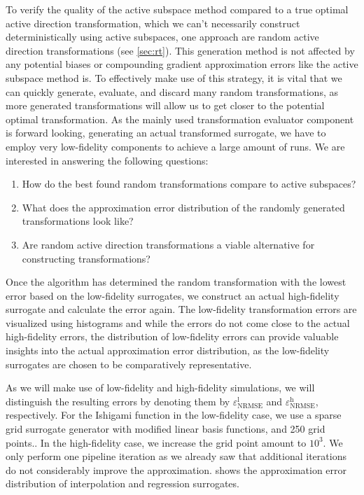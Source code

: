 \documentclass[
  a4paper,  %
  twoside,  %
  bibliography=totoc,
  headsepline,
  cleardoublepage=empty,
  parskip=half,
  draft=false
]{scrbook}
\begin{document}
To verify the quality of the active subspace method compared to a true optimal active direction transformation, which we can't necessarily construct deterministically using active subspaces, one approach are random active direction transformations (see \cref{sec:rt}).
This generation method is not affected by any potential biases or compounding gradient approximation errors like the active subspace method is.
To effectively make use of this strategy, it is vital that we can quickly generate, evaluate, and discard many random transformations, as more generated transformations will allow us to get closer to the potential optimal transformation.
As the mainly used transformation evaluator component is forward looking, \ie generating an actual transformed surrogate, we have to employ very low-fidelity components to achieve a large amount of runs.
We are interested in answering the following questions:
\begin{enumerate}
\item How do the best found random transformations compare to active subspaces?
\item What does the approximation error distribution of the randomly generated transformations look like?
\item Are random active direction transformations a viable alternative for constructing transformations?
\end{enumerate}
%
Once the algorithm has determined the random transformation with the lowest error based on the low-fidelity surrogates, we construct an actual high-fidelity surrogate and calculate the error again.
The low-fidelity transformation errors are visualized using histograms and while the errors do not come close to the actual high-fidelity errors, the distribution of low-fidelity errors can provide valuable insights into the actual approximation error distribution, as the low-fidelity surrogates are chosen to be comparatively representative.

As we will make use of low-fidelity and high-fidelity simulations, we will distinguish the resulting errors by denoting them by $\varepsilon^\mathrm{l}_{\mathrm{NRMSE}}$ and $\varepsilon^\mathrm{h}_{\mathrm{NRMSE}}$, respectively.
For the Ishigami function in the low-fidelity case, we use a sparse grid surrogate generator with modified linear basis functions, and 250 grid points..
In the high-fidelity case, we increase the grid point amount to $10^3$.
We only perform one pipeline iteration as we already saw that additional iterations do not considerably improve the approximation.
 shows the approximation error distribution of interpolation and regression surrogates.
\end{document}
